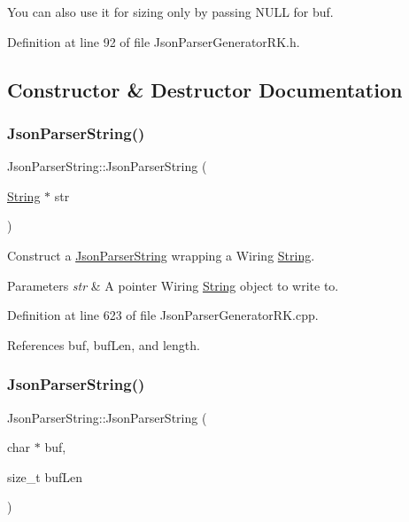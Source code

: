 You can also use it for sizing only by passing N\+U\+LL for buf. 

Definition at line 92 of file Json\+Parser\+Generator\+R\+K.\+h.



\subsection{Constructor \& Destructor Documentation}
\mbox{\label{class_json_parser_string_a3942a87b6920b08e38ce01b4d4a41fc4}} 
\subsubsection{\texorpdfstring{Json\+Parser\+String()}{JsonParserString()}\hspace{0.1cm}{\footnotesize\ttfamily [1/2]}}
{\footnotesize\ttfamily Json\+Parser\+String\+::\+Json\+Parser\+String (\begin{DoxyParamCaption}\item[{\hyperlink{class_string}{String} $\ast$}]{str }\end{DoxyParamCaption})}



Construct a \hyperlink{class_json_parser_string}{Json\+Parser\+String} wrapping a Wiring \hyperlink{class_string}{String}. 


\begin{DoxyParams}{Parameters}
{\em str} & A pointer Wiring \hyperlink{class_string}{String} object to write to. \\
\hline
\end{DoxyParams}


Definition at line 623 of file Json\+Parser\+Generator\+R\+K.\+cpp.



References buf, buf\+Len, and length.

\mbox{\label{class_json_parser_string_ae0f9e3309682685ed259ad1370eb448f}} 
\subsubsection{\texorpdfstring{Json\+Parser\+String()}{JsonParserString()}\hspace{0.1cm}{\footnotesize\ttfamily [2/2]}}
{\footnotesize\ttfamily Json\+Parser\+String\+::\+Json\+Parser\+String (\begin{DoxyParamCaption}\item[{char $\ast$}]{buf,  }\item[{size\+\_\+t}]{buf\+Len }\end{DoxyParamCaption})}




